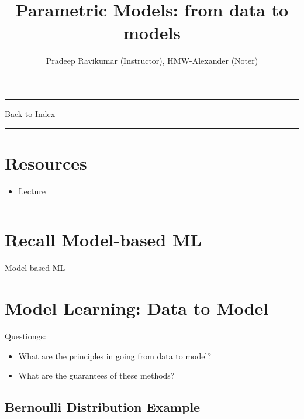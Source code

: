 \documentclass[letterpaper,10pt]{article}
\title{\textbf{Parametric Models: from data to models}}
\author{Pradeep Ravikumar (Instructor), HMW-Alexander (Noter)}
\newcommand{\panhline}{\begin{center}\rule{\textwidth}{1pt}\end{center}}
\begin{document}
\maketitle

\panhline
\href{../index.html}{Back to Index}

\panhline
\tableofcontents

\section*{Resources}

\begin{itemize}
	\item \href{../../Lectures/02_ParametricModels.pdf}{Lecture}
\end{itemize}

\panhline

\section{Recall Model-based ML}
	
\href{../01_Introduction/document.html}{Model-based ML}

\section{Model Learning: Data to Model}

Questiongs:
\begin{itemize}
	\item What are the principles in going from data to model?
	\item What are the guarantees of these methods?
\end{itemize}

\subsection{Bernoulli Distribution Example}
\end{document}
